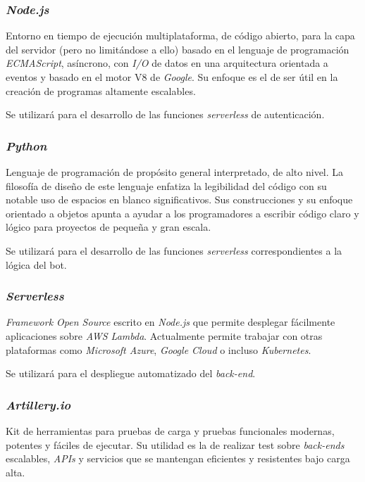 \documentclass[11pt,spanish,listoffigures]{tfgetsinf}
\begin{document}
\subsubsection{\textit{Node.js}}

Entorno en tiempo de ejecución multiplataforma, de código abierto, para la capa del servidor (pero no limitándose a ello) basado en el lenguaje de programación \textit{ECMAScript}, asíncrono, con \textit{I/O} de datos en una arquitectura orientada a eventos y basado en el motor V8 de \textit{Google}. Su enfoque es el de ser útil en la creación de programas altamente escalables.

Se utilizará para el desarrollo de las funciones \textit{serverless} de autenticación.

\subsubsection{\textit{Python}}
Lenguaje de programación de propósito general interpretado, de alto nivel. La filosofía de diseño de este lenguaje enfatiza la legibilidad del código con su notable uso de espacios en blanco significativos. Sus construcciones y su enfoque orientado a objetos apunta a ayudar a los programadores a escribir código claro y lógico para proyectos de pequeña y gran escala.

Se utilizará para el desarrollo de las funciones \textit{serverless} correspondientes a la lógica del bot.

\subsubsection{\textit{Serverless}}

\textit{Framework Open Source} escrito en \textit{Node.js} que permite desplegar fácilmente aplicaciones sobre \textit{AWS Lambda}. Actualmente permite trabajar con otras plataformas como \textit{Microsoft Azure}, \textit{Google Cloud} o incluso \textit{Kubernetes}.

Se utilizará para el despliegue automatizado del \textit{back-end}.

\subsubsection{\textit{Artillery.io}}

Kit de herramientas para pruebas de carga y pruebas funcionales modernas, potentes y fáciles de ejecutar. Su utilidad es la de realizar test sobre \textit{back-ends} escalables, \textit{APIs} y servicios que se mantengan eficientes y resistentes bajo carga alta.
\end{document}
